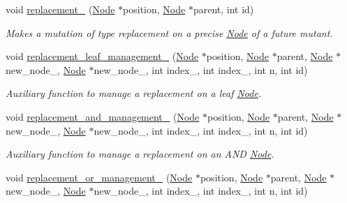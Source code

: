 \begin{DoxyCompactItemize}
\mbox{\label{classEvolution_aca700a0c053e1d6665aa184c773f3b9a}} 
void \hyperlink{classEvolution_aca700a0c053e1d6665aa184c773f3b9a}{replacement\+\_\+} (\hyperlink{classNode}{Node} $\ast$position, \hyperlink{classNode}{Node} $\ast$parent, int id)
\begin{DoxyCompactList}\small\item\em Makes a mutation of type replacement on a precise \hyperlink{classNode}{Node} of a future mutant. \end{DoxyCompactList}\item 
\mbox{\label{classEvolution_ae58e042dadbc735ede6f295050348348}} 
void \hyperlink{classEvolution_ae58e042dadbc735ede6f295050348348}{replacement\+\_\+leaf\+\_\+management\+\_\+} (\hyperlink{classNode}{Node} $\ast$position, \hyperlink{classNode}{Node} $\ast$parent, \hyperlink{classNode}{Node} $\ast$new\+\_\+node\+\_, \hyperlink{classNode}{Node} $\ast$new\+\_\+node\+\_, int index\+\_, int index\+\_, int n, int id)
\begin{DoxyCompactList}\small\item\em Auxiliary function to manage a replacement on a leaf \hyperlink{classNode}{Node}. \end{DoxyCompactList}\item 
\mbox{\label{classEvolution_ab0df05e5d9386e6c4e28fedf4e714ba2}} 
void \hyperlink{classEvolution_ab0df05e5d9386e6c4e28fedf4e714ba2}{replacement\+\_\+and\+\_\+management\+\_\+} (\hyperlink{classNode}{Node} $\ast$position, \hyperlink{classNode}{Node} $\ast$parent, \hyperlink{classNode}{Node} $\ast$new\+\_\+node\+\_, \hyperlink{classNode}{Node} $\ast$new\+\_\+node\+\_, int index\+\_, int index\+\_, int n, int id)
\begin{DoxyCompactList}\small\item\em Auxiliary function to manage a replacement on an A\+ND \hyperlink{classNode}{Node}. \end{DoxyCompactList}\item 
\mbox{\label{classEvolution_aa5bfb77427e28dfb74a5743459492204}} 
void \hyperlink{classEvolution_aa5bfb77427e28dfb74a5743459492204}{replacement\+\_\+or\+\_\+management\+\_\+} (\hyperlink{classNode}{Node} $\ast$position, \hyperlink{classNode}{Node} $\ast$parent, \hyperlink{classNode}{Node} $\ast$new\+\_\+node\+\_, \hyperlink{classNode}{Node} $\ast$new\+\_\+node\+\_, int index\+\_, int index\+\_, int n, int id)

\end{DoxyCompactItemize}
